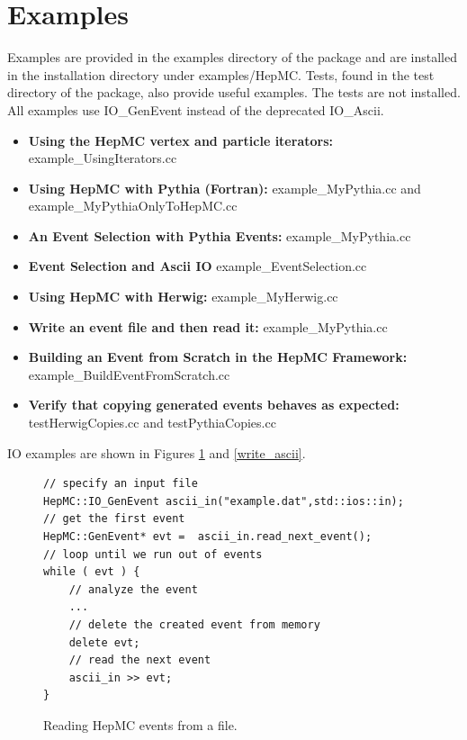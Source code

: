 \documentclass[11pt,letterpaper]{article}
\begin{document}
%
%

\section{Examples}
\label{examples}
Examples are provided in the examples directory of the package 
and are installed in the installation directory under examples/HepMC.
Tests, found in the test directory of the package, also provide useful examples.
The tests are not installed.
All examples use IO\_GenEvent instead of the deprecated IO\_Ascii.

\begin{itemize}\setlength{\itemsep}{0pt}
  \item{\bf Using the HepMC vertex and particle iterators:}
       {example\_UsingIterators.cc} 
  \item{\bf Using HepMC with Pythia (Fortran):}
      {example\_MyPythia.cc and
       example\_MyPythiaOnlyToHepMC.cc}
  \item{\bf An Event Selection with Pythia Events:}
      {example\_MyPythia.cc}
  \item{\bf Event Selection and Ascii IO}
      {example\_EventSelection.cc}
  \item{\bf Using HepMC with Herwig:}
     {example\_MyHerwig.cc}
 \item{\bf Write an event file and then read it:}
     {example\_MyPythia.cc}
  \item{\bf Building an Event from Scratch in the HepMC Framework:}
     {example\_BuildEventFromScratch.cc}
  \item{\bf Verify that copying generated events behaves as expected:}
     {testHerwigCopies.cc and testPythiaCopies.cc}
\end{itemize}

IO examples are shown in Figures \ref{read_ascii} and \ref{write_ascii}.

\begin{figure}[h]
\caption[IO\_GenEvent exmple]{\label{read_ascii} Reading HepMC events from a file. }
{\small \begin{verbatim}
// specify an input file
HepMC::IO_GenEvent ascii_in("example.dat",std::ios::in);
// get the first event
HepMC::GenEvent* evt =  ascii_in.read_next_event();
// loop until we run out of events
while ( evt ) {
    // analyze the event
    ...
    // delete the created event from memory
    delete evt;
    // read the next event
    ascii_in >> evt;
}
\end{verbatim}}
\end{figure}
\end{document}
